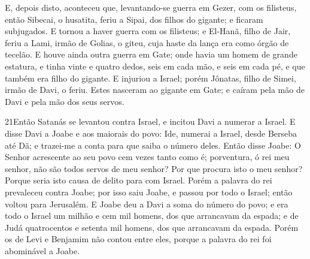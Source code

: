 E, depois disto, aconteceu que, levantando-se guerra em Gezer, com
os filisteus, então Sibecai, o husatita, feriu a Sipai, dos filhos
do gigante; e ficaram subjugados. E tornou a haver guerra com os
filisteus; e El-Hanã, filho de Jair, feriu a Lami, irmão de Golias,
o giteu, cuja haste da lança era como órgão de tecelão. E houve
ainda outra guerra em Gate; onde havia um homem de grande estatura,
e tinha vinte e quatro dedos, seis em cada mão, e seis em cada pé, e
que também era filho do gigante. E injuriou a Israel; porém
Jônatas, filho de Simei, irmão de Davi, o feriu. Estes nasceram
ao gigante em Gate; e caíram pela mão de Davi e pela mão dos seus
servos.

\medskip

\lettrine{21} Então Satanás se levantou contra Israel, e
incitou Davi a numerar a Israel. E disse Davi a Joabe e aos
maiorais do povo: Ide, numerai a Israel, desde Berseba até Dã; e
trazei-me a conta para que saiba o número deles. Então disse
Joabe: O Senhor acrescente ao seu povo cem vezes tanto como é;
porventura, ó rei meu senhor, não são todos servos de meu senhor?
Por que procura isto o meu senhor? Porque seria isto causa de delito
para com Israel. Porém a palavra do rei prevaleceu contra Joabe;
por isso saiu Joabe, e passou por todo o Israel; então voltou para
Jerusalém. E Joabe deu a Davi a soma do número do povo; e era
todo o Israel um milhão e cem mil homens, dos que arrancavam da
espada; e de Judá quatrocentos e setenta mil homens, dos que
arrancavam da espada. Porém os de Levi e Benjamim não contou
entre eles, porque a palavra do rei foi abominável a Joabe.

